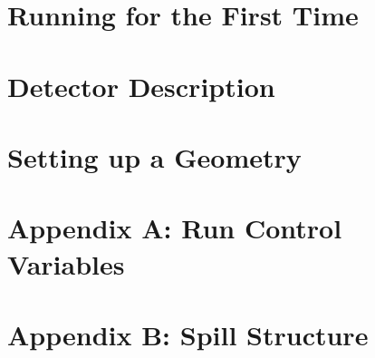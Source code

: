 \documentclass[a4paper, 10pt] {report}
\begin{document}
\chapter{Running for the First Time}


\chapter{Detector Description}






\chapter{Setting up a Geometry}

\chapter{Appendix A: Run Control Variables}

\chapter{Appendix B: Spill Structure}
\end{document}
